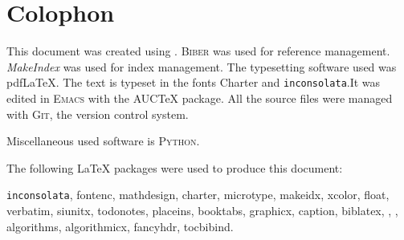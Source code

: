 \chapter*{Colophon}

This document was created using \LaTeXe{}. \textsc{Biber} was used for
reference management. \textit{MakeIndex} was used for index
management. The typesetting software used was pdf\LaTeX{}. The text is
typeset in the fonts Charter and \texttt{inconsolata}.It was edited in
\textsc{Emacs} with the AUC\TeX{} package. All the source files were
managed with \textsc{Git}, the version control
system.

Miscellaneous used software is \textsc{Python}.

The following \LaTeX{} packages were used to produce this document:

\texttt{inconsolata}, fontenc, mathdesign, charter, microtype,
makeidx, xcolor, float, verbatim, siunitx, todonotes, placeins,
booktabs, graphicx, caption, biblatex, \tikzname{},\pgfname{} , algorithms,
algorithmicx, fancyhdr, tocbibind.

